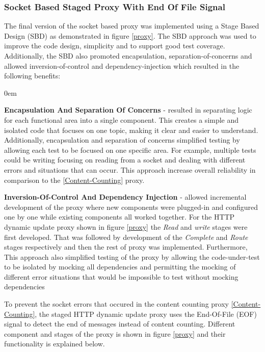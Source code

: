 \documentclass[a4paper,11pt,twoside]{article}
\begin{document}
\subsubsection{Socket Based Staged Proxy With End Of File Signal}\label{staged}
The final version of the socket based proxy was implemented using a Stage Based Design (SBD) as demonstrated in figure \ref{proxy}. The SBD approach was used to improve the code design, simplicity and to support good test coverage. Additionally, the SBD also promoted encapsulation, separation-of-concerns and allowed inversion-of-control and dependency-injection which resulted in the following benefits:

\begin{list}{-}{}
  \itemsep0em
  \item\textbf{Encapsulation And Separation Of Concerns} - resulted in separating logic for each functional area into a single component. This creates a simple and isolated code that focuses on one topic, making it clear and easier to understand. Additionally, encapsulation and separation of concerns simplified testing by allowing each test to be focused on one specific area. For example, multiple tests could be writing focusing on reading from a socket and dealing with different errors and situations that can occur.  This approach increase overall reliability in comparison to the \ref{Content-Counting} proxy. 

  \item\textbf{Inversion-Of-Control And Dependency Injection} - allowed incremental development of the proxy where new components were plugged-in and configured one by one while existing components all worked together. For the HTTP dynamic update proxy shown in figure \ref{proxy} the \textit{Read} and \textit{write} stages were first developed. That was followed by development of the  \textit{Complete} and \textit{Route} stages respectively and then the rest of proxy was implemented. Furthermore, This approach also simplified testing of the proxy by allowing the code-under-test to be isolated by mocking all dependencies and permitting the mocking of different error situations that would be impossible to test without mocking dependencies  
\end{list}

\noindent
To prevent the socket errors that occured in the content counting proxy \ref{Content-Counting}, the staged HTTP dynamic update proxy uses the End-Of-File (EOF) signal to detect the end of messages instead of content counting. Different component and stages of the proxy is shown in figure \ref{proxy} and their functionality is explained below.\bigskip
\end{document}
